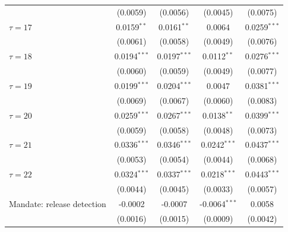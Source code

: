 \begin{tabular}{lcccc}
                                                & (0.0059)        & (0.0056)               & (0.0045)                    & (0.0075)\\   
   $\tau = 17$                                  & 0.0159$^{**}$   & 0.0161$^{**}$          & 0.0064                      & 0.0259$^{***}$\\   
                                                & (0.0061)        & (0.0058)               & (0.0049)                    & (0.0076)\\   
   $\tau = 18$                                  & 0.0194$^{***}$  & 0.0197$^{***}$         & 0.0112$^{**}$               & 0.0276$^{***}$\\   
                                                & (0.0060)        & (0.0059)               & (0.0049)                    & (0.0077)\\   
   $\tau = 19$                                  & 0.0199$^{***}$  & 0.0204$^{***}$         & 0.0047                      & 0.0381$^{***}$\\   
                                                & (0.0069)        & (0.0067)               & (0.0060)                    & (0.0083)\\   
   $\tau = 20$                                  & 0.0259$^{***}$  & 0.0267$^{***}$         & 0.0138$^{**}$               & 0.0399$^{***}$\\   
                                                & (0.0059)        & (0.0058)               & (0.0048)                    & (0.0073)\\   
   $\tau = 21$                                  & 0.0336$^{***}$  & 0.0346$^{***}$         & 0.0242$^{***}$              & 0.0437$^{***}$\\   
                                                & (0.0053)        & (0.0054)               & (0.0044)                    & (0.0068)\\   
   $\tau = 22$                                  & 0.0324$^{***}$  & 0.0337$^{***}$         & 0.0218$^{***}$              & 0.0443$^{***}$\\   
                                                & (0.0044)        & (0.0045)               & (0.0033)                    & (0.0057)\\   
   Mandate: release detection                   & -0.0002         & -0.0007                & -0.0064$^{***}$             & 0.0058\\   
                                                & (0.0016)        & (0.0015)               & (0.0009)                    & (0.0042)\\   

\end{tabular}
